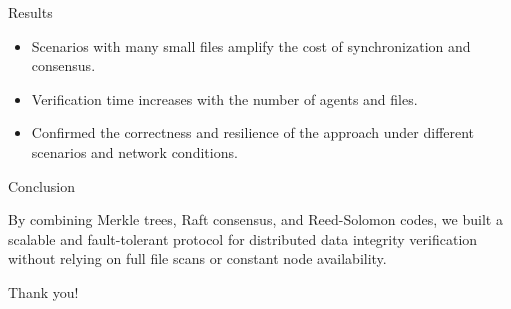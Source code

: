 \begin{frame}{Results}
\begin{itemize}
\item Scenarios with many small files amplify the cost of synchronization and consensus.
\item Verification time increases with the number of agents and files.
\item Confirmed the correctness and resilience of the approach under different scenarios and network conditions.
\end{itemize}
\end{frame}

\begin{frame}{Conclusion}

By combining Merkle trees, Raft consensus, and Reed-Solomon codes, we built a scalable and fault-tolerant protocol for distributed data integrity verification without relying on full file scans or constant node availability.

\vspace{2cm}
\centering
Thank you!
\end{frame}

